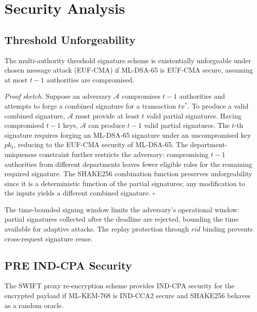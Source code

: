 \documentclass[conference,10pt]{IEEEtran}
\begin{document}
\section{Security Analysis}

\subsection{Threshold Unforgeability}

\begin{theorem}
The multi-authority threshold signature scheme is existentially unforgeable under chosen message attack (EUF-CMA) if ML-DSA-65 is EUF-CMA secure, assuming at most $t-1$ authorities are compromised.
\end{theorem}

\textit{Proof sketch.} Suppose an adversary $\mathcal{A}$ compromises $t-1$ authorities and attempts to forge a combined signature for a transaction $tx^*$. To produce a valid combined signature, $\mathcal{A}$ must provide at least $t$ valid partial signatures. Having compromised $t-1$ keys, $\mathcal{A}$ can produce $t-1$ valid partial signatures. The $t$-th signature requires forging an ML-DSA-65 signature under an uncompromised key $pk_t$, reducing to the EUF-CMA security of ML-DSA-65. The department-uniqueness constraint further restricts the adversary: compromising $t-1$ authorities from different departments leaves fewer eligible roles for the remaining required signature. The SHAKE256 combination function preserves unforgeability since it is a deterministic function of the partial signatures; any modification to the inputs yields a different combined signature. $\square$

The time-bounded signing window limits the adversary's operational window: partial signatures collected after the deadline are rejected, bounding the time available for adaptive attacks. The replay protection through $rid$ binding prevents cross-request signature reuse.

\subsection{PRE IND-CPA Security}

\begin{theorem}
The SWIFT proxy re-encryption scheme provides IND-CPA security for the encrypted payload if ML-KEM-768 is IND-CCA2 secure and SHAKE256 behaves as a random oracle.
\end{theorem}
\end{document}
